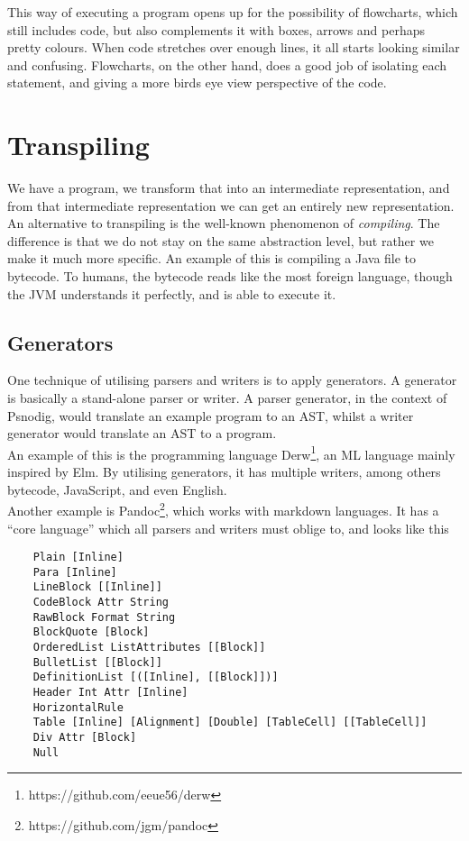 This way of executing a program opens up for the possibility of flowcharts, which still includes code, but also complements it with boxes, arrows and perhaps pretty colours. When code stretches over enough lines, it all starts looking similar and confusing. Flowcharts, on the other hand, does a good job of isolating each statement, and giving a more birds eye view perspective of the code.

\section{Transpiling}
We have a program, we transform that into an intermediate representation, and from that intermediate representation we can get an entirely new representation. \hfill \\

An alternative to transpiling is the well-known phenomenon of \textit{compiling}. The difference is that we do not stay on the same abstraction level, but rather we make it much more specific. An example of this is compiling a Java file to bytecode. To humans, the bytecode reads like the most foreign language, though the JVM understands it perfectly, and is able to execute it. \hfill \\

\subsection{Generators}
One technique of utilising parsers and writers is to apply generators. A generator is basically a stand-alone parser or writer. A parser generator, in the context of Psnodig, would translate an example program to an AST, whilst a writer generator would translate an AST to a program. \hfill \\

An example of this is the programming language Derw\footnote{https://github.com/eeue56/derw}, an ML language mainly inspired by Elm. By utilising generators, it has multiple writers, among others bytecode, JavaScript, and even English. \hfill \\

Another example is Pandoc\footnote{https://github.com/jgm/pandoc}, which works with markdown languages. It has a ``core language'' which all parsers and writers must oblige to, and looks like this

\begin{verbatim}
    Plain [Inline]
    Para [Inline]
    LineBlock [[Inline]]
    CodeBlock Attr String
    RawBlock Format String
    BlockQuote [Block]
    OrderedList ListAttributes [[Block]]
    BulletList [[Block]]
    DefinitionList [([Inline], [[Block]])]
    Header Int Attr [Inline]
    HorizontalRule
    Table [Inline] [Alignment] [Double] [TableCell] [[TableCell]]
    Div Attr [Block]
    Null
\end{verbatim}

